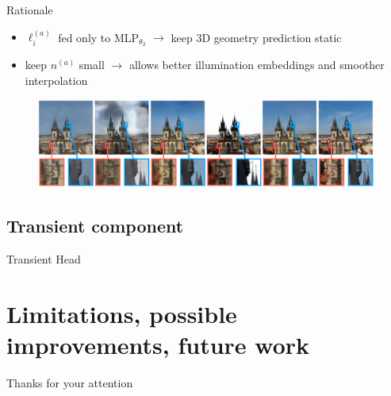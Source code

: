 \documentclass[aspectratio=1610]{beamer}
\begin{document}
\begin{frame}{Rationale}
    \begin{itemize}
        \item \(\ell_i^{(a)}\) fed only to MLP\(_{\theta_2}\) \(\rightarrow\) keep 3D geometry prediction static
        \item keep \(n^{(a)}\) small \(\rightarrow\) allows better illumination embeddings and smoother interpolation
    \end{itemize}
    \bigskip
    \begin{figure}[H]
        \centering
        \includegraphics[width=\textwidth,keepaspectratio]{nerfa-results.png}
    \end{figure}
\end{frame}

\subsection*{Transient component}
\begin{frame}{Transient Head}
    
\end{frame}

\section{Limitations, possible improvements, future work}
\begin{frame}
    \begin{center}
        Thanks for your attention
    \end{center}
\end{frame}
\end{document}
